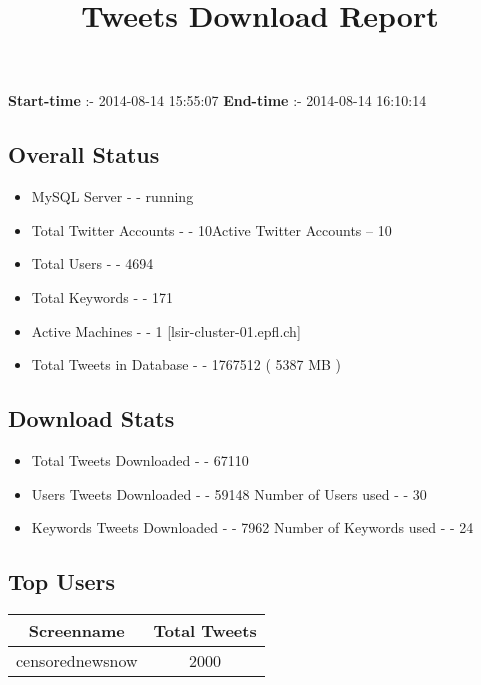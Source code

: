 \documentclass{article}\usepackage[T1]{fontenc}
\begin{document}
\title{\textbf{Tweets Download Report}}
               \date{}
                \maketitle
               \centerline{\textbf{Start-time} :- 2014-08-14 15:55:07 \hspace{40pt} \textbf{End-time} :- 2014-08-14 16:10:14}               \subsection*{Overall Status}                \begin{itemize}                \item MySQL Server - - running               \item Total Twitter Accounts - - 10\newline Active Twitter Accounts -- 10               \item Total Users - - 4694               \item Total Keywords - - 171               \item Active Machines - - 1 [lsir-cluster-01.epfl.ch]               \item Total Tweets in Database - - 1767512 ( 5387 MB )               \end{itemize}               \subsection*{Download Stats}                \begin{itemize}                \item Total Tweets Downloaded - - 67110               \item Users Tweets Downloaded - - 59148 \newline Number of Users used - - 30               \item Keywords Tweets Downloaded - - 7962 \newline Number of Keywords used - - 24              \end{itemize}              \subsection*{Top Users}\begin{tabular}{|c|c|}         \hline         Screenname & Total Tweets \\ 
 \hline
censorednewsnow & 2000\\ 

\end{tabular}
\end{document}
